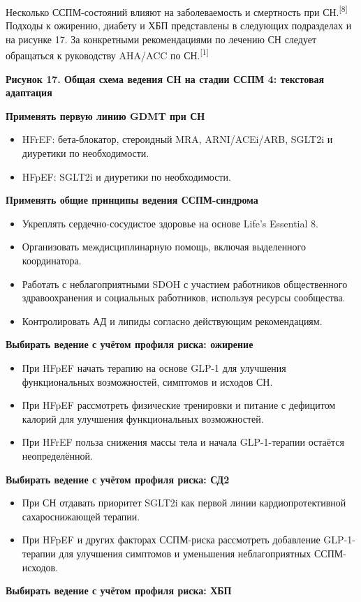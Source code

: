 \documentclass[11pt,a4paper]{article}
\newcommand{\src}[1]{\textsuperscript{[#1]}}
\newcommand{\heading}[1]{\par\medskip\textbf{#1}\par}
\begin{document}
Несколько ССПМ-состояний влияют на заболеваемость и смертность при СН.\src{8} Подходы к ожирению, диабету и ХБП представлены в следующих подразделах и на рисунке 17. За конкретными рекомендациями по лечению СН следует обращаться к руководству AHA/ACC по СН.\src{1}

\heading{Рисунок 17. Общая схема ведения СН на стадии ССПМ 4: текстовая адаптация}
\heading{Применять первую линию GDMT при СН}
\begin{itemize}
\item HFrEF: бета-блокатор, стероидный MRA, ARNI/ACEi/ARB, SGLT2i и диуретики по необходимости.
\item HFpEF: SGLT2i и диуретики по необходимости.
\end{itemize}
\heading{Применять общие принципы ведения ССПМ-синдрома}
\begin{itemize}
\item Укреплять сердечно-сосудистое здоровье на основе Life's Essential 8.
\item Организовать междисциплинарную помощь, включая выделенного координатора.
\item Работать с неблагоприятными SDOH с участием работников общественного здравоохранения и социальных работников, используя ресурсы сообщества.
\item Контролировать АД и липиды согласно действующим рекомендациям.
\end{itemize}
\heading{Выбирать ведение с учётом профиля риска: ожирение}
\begin{itemize}
\item При HFpEF начать терапию на основе GLP-1 для улучшения функциональных возможностей, симптомов и исходов СН.
\item При HFpEF рассмотреть физические тренировки и питание с дефицитом калорий для улучшения функциональных возможностей.
\item При HFrEF польза снижения массы тела и начала GLP-1-терапии остаётся неопределённой.
\end{itemize}
\heading{Выбирать ведение с учётом профиля риска: СД2}
\begin{itemize}
\item При СН отдавать приоритет SGLT2i как первой линии кардиопротективной сахароснижающей терапии.
\item При HFpEF и других факторах ССПМ-риска рассмотреть добавление GLP-1-терапии для улучшения симптомов и уменьшения неблагоприятных ССПМ-исходов.
\end{itemize}
\heading{Выбирать ведение с учётом профиля риска: ХБП}
\end{document}
